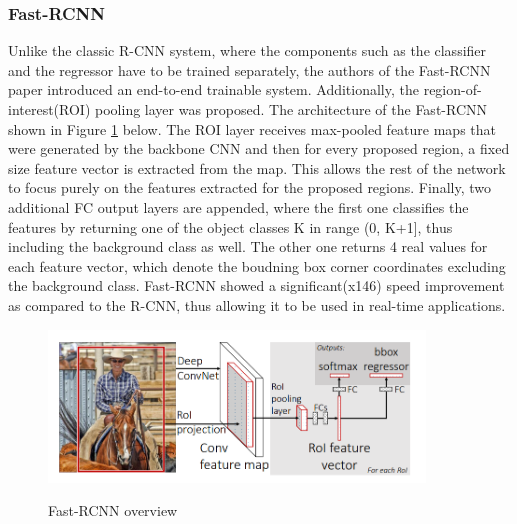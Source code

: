 \documentclass[english, 12pt, a4paper, elec, utf8, a-1b, online]{aaltothesis}
\begin{document}
\subsubsection{Fast-RCNN}
Unlike the classic R-CNN system, where the components such as the classifier and the regressor have to be trained separately, the authors of the Fast-RCNN \cite{Girshick2015} paper introduced an end-to-end trainable system. Additionally, the region-of-interest(ROI) pooling layer was proposed. The architecture of the Fast-RCNN shown in Figure \ref{fast_rcnn} below. The ROI layer receives max-pooled feature maps that were generated by the backbone CNN and then for every proposed region, a fixed size feature vector is extracted from the map. This allows the rest of the network to focus purely on the features extracted for the proposed regions. Finally, two additional FC output layers are appended, where the first one classifies the features by returning one of the object classes K in range (0, K+1], thus including the background class as well. The other one returns 4 real values for each feature vector, which denote the boudning box corner coordinates excluding the background class. \cite{Girshick2015} Fast-RCNN showed a significant(x146) speed improvement as compared to the R-CNN, thus allowing it to be used in real-time applications\cite{Girshick2013}.

\begin{figure}[htb]
	\begin{center}
		\includegraphics[width=10cm]{./fast_rcnn.png}
	\end{center}
	\caption{Fast-RCNN overview\cite{Girshick2015}}
	\begin{center}
		\label{fast_rcnn}
	\end{center}
\end{figure}
\FloatBarrier
\end{document}
